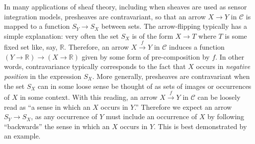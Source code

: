 In many applications of sheaf theory, including when sheaves are used as sensor integration models, presheaves are contravariant, so that an arrow $X \to Y$ in $\mathcal{C}$ is mapped to a function $S_Y \to S_X$ between sets. The arrow-flipping typically has a simple explanation: very often the set $S_X$ is of the form $X \to T$ where $T$ is some fixed set like, say, $\mathbb{R}$. Therefore, an arrow $X \xrightarrow{f} Y$ in $\mathcal{C}$ induces a function $\left(Y \to \mathbb{R}\right) \to \left(X \to \mathbb{R}\right)$ given by some form of pre-composition by $f$. In other words, contravariance typically corresponds to the fact that $X$ occurs in \emph{negative position} in the expression $S_X$. More generally, presheaves are contravariant when the set $S_X$ can in some loose sense be thought of as sets of images or occurrences of $X$ in some context. With this reading, an arrow $X \xrightarrow{f} Y$ in $\mathcal{C}$ can be loosely read as ``a sense in which an $X$ occurs in $Y$.'' Therefore we expect an arrow $S_Y \to S_X$, as any occurrence of $Y$ must include an occurrence of $X$ by following ``backwards'' the sense in which an $X$ occurs in $Y$. This is best demonstrated by an example.

